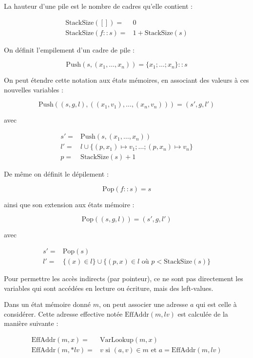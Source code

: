 \begin{definition}

  La hauteur d'une pile est le nombre de cadres qu'elle contient :

  \begin{align*}
    \mathrm{StackSize}([])     = & 0 \\
    \mathrm{StackSize}(f::s) = & 1 + \mathrm{StackSize}(s)
  \end{align*}

  On définit l'empilement d'un cadre de pile :

  \[
    \mathrm{Push}(s, (x_1, …, x_n)) = \{ x_1 ; … ; x_n \}::s
  \]

  On peut étendre cette notation aux états mémoires, en associant des valeurs à
  ces nouvelles variables :

  \[
    \mathrm{Push}((s, g, l), ((x_1, v_1), …, (x_n, v_n))) = (s', g, l')
  \]

  avec

  \begin{align*}
    s' = & \mathrm{Push}(s, (x_1, …, x_n)) \\
    l' = & l \cup \{(p, x_1) ↦ v_1; … ; (p, x_n) ↦ v_n\} \\
    p  = & \mathrm{StackSize}(s) + 1
  \end{align*}

  De même on définit le dépilement :

  \[
    \mathrm{Pop}(f::s) = s
  \]

  ainsi que son extension aux états mémoire :

  \[
    \mathrm{Pop}((s, g, l)) = (s', g, l')
  \]

  avec

  \begin{align*}
    s' = & \mathrm{Pop}(s) \\
    l' = & \{ (x) ∈ l \} \cup \{ (p, x) ∈ l \mbox{ où } p < \mathrm{StackSize}(s) \}
  \end{align*}

\end{definition}

\begin{definition}

  Pour permettre les accès indirects (par pointeur), ce ne sont pas directement
  les variables qui sont accédées en lecture ou écriture, mais des left-values.

  Dans un état mémoire donné $m$, on peut associer une adresse $a$ qui est celle
  à considérer. Cette adresse effective notée $\mathrm{EffAddr}(m, lv)$ est
  calculée de la manière suivante :

  \begin{align*}
    \mathrm{EffAddr}(m, x)   = & \mathrm{VarLookup}(m, x) \\
    \mathrm{EffAddr}(m, *lv) = & v \textrm{ si } (a, v) ∈ m
                                 \textrm{ et } a = \mathrm{EffAddr}(m, lv)
  \end{align*}
\end{definition}

